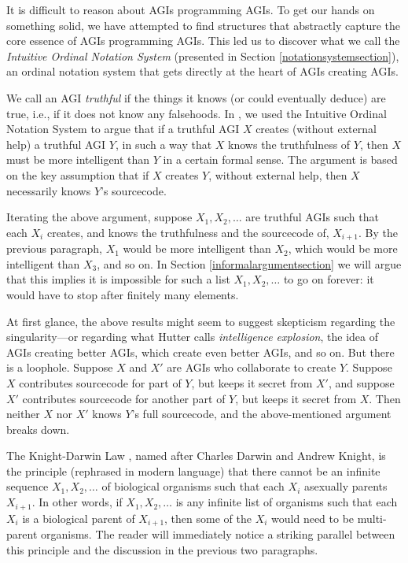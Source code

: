 \documentclass[runningheads]{llncs}
\begin{document}
It is difficult to reason about AGIs programming AGIs. To get our hands on something solid,
we have attempted to find structures that abstractly capture the core essence of
AGIs programming AGIs. This led us to discover
what we call the \emph{Intuitive Ordinal Notation System} (presented in Section
\ref{notationsystemsection}), an ordinal notation system that gets directly at
the heart of AGIs creating AGIs.

We call an AGI \emph{truthful} if the things it knows (or could eventually deduce) are true,
i.e., if it does not know any falsehoods.
In \cite{alexander2019measuring}, we used the Intuitive Ordinal Notation System to argue
that if a truthful AGI $X$ creates (without external help) a truthful AGI $Y$, in such a way
that $X$ knows the truthfulness of $Y$, then $X$ must be more intelligent than $Y$
in a certain formal sense. The argument is based on the key assumption that if $X$
creates $Y$, without external help, then $X$ necessarily knows $Y$'s sourcecode.

Iterating the above argument, suppose $X_1,X_2,\ldots$
are truthful AGIs such that each $X_i$ creates, and knows the truthfulness and
the sourcecode of, $X_{i+1}$. By the previous paragraph, $X_1$ would be more
intelligent than $X_2$, which would be more
intelligent than $X_3$, and so on.
In Section \ref{informalargumentsection} we will argue that this implies
it is impossible for such
a list $X_1,X_2,\ldots$ to go on forever: it would have to stop after finitely
many elements.

At first glance, the above results might
seem to suggest skepticism regarding the singularity---or regarding
what Hutter \cite{hutter2012} calls \emph{intelligence explosion}, the idea of
AGIs creating better AGIs, which create even better AGIs, and so on.
But there is a loophole. Suppose $X$ and $X'$ are AGIs
who collaborate to create $Y$. Suppose $X$ contributes sourcecode for
part of $Y$, but keeps it secret from $X'$, and suppose $X'$ contributes
sourcecode for another part of $Y$, but keeps it secret from $X$. Then neither
$X$ nor $X'$ knows $Y$'s full sourcecode, and the above-mentioned argument
breaks down.


The Knight-Darwin Law \cite{darwin1898knight}, named after Charles Darwin
and Andrew Knight, is the
principle (rephrased in modern language) that there cannot be an infinite
sequence $X_1,X_2,\ldots$ of biological organisms such that each $X_i$ asexually
parents $X_{i+1}$. In other words, if $X_1,X_2,\ldots$ is any infinite list of
organisms such that each $X_i$ is a biological parent of $X_{i+1}$, then some of the
$X_i$ would need to be multi-parent organisms.
The reader will immediately notice a striking parallel between
this principle and the discussion in the previous two paragraphs.
\end{document}
